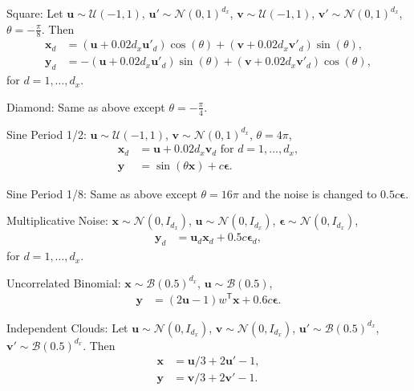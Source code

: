 \documentclass[11pt]{article}
\newcommand{\T}{^{\ensuremath{\mathsf{T}}}}           %
\providecommand{\mb}[1]{\boldsymbol{#1}}
\providecommand{\mc}[1]{\mathcal{#1}}
\begin{document}
\begin{compactenum}
\item Square: Let $\mb{u} \sim \mc{U}(-1,1)$, $\mb{u}' \sim \mc{N}(0,1)^{d_{x}}$, $\mb{v} \sim \mc{U}(-1,1)$, $\mb{v}' \sim \mc{N}(0,1)^{d_{x}}$, $\theta=-\frac{\pi}{8}$. Then
\begin{align*}
\mb{x}_{d}&=(\mb{u}+0.02 d_{x}\mb{u}'_{d}) \cos(\theta) + (\mb{v}+0.02 d_{x}\mb{v}'_{d}) \sin(\theta),\\
\mb{y}_{d}&=-(\mb{u}+0.02 d_{x}\mb{u}'_{d}) \sin(\theta) + (\mb{v}+0.02 d_{x}\mb{v}'_{d}) \cos(\theta),
\end{align*}
for $d=1,\ldots,d_{x}$.
\item Diamond: Same as above except $\theta=-\frac{\pi}{4}$.
\item Sine Period 1/2: $\mb{u} \sim \mc{U}(-1,1)$, $\mb{v} \sim \mc{N}(0,1)^{d_{x}}$, $\theta=4\pi$,
\begin{align*}
\mb{x}_{d}&=\mb{u}+0.02 d_{x} \mb{v}_{d} \mbox{ for $d=1,\ldots,d_{x}$}, \\
\mb{y}&=\sin ( \theta \mb{x} )+c\mb{\epsilon}.
\end{align*}
\item Sine Period 1/8: Same as above except $\theta=16\pi$ and the noise is changed to $0.5c\mb{\epsilon}$.
\item Multiplicative Noise: $\mb{x} \sim \mc{N}(0, I_{d_{x}})$, $\mb{u} \sim \mc{N}(0, I_{d_{x}})$, $\mb{\epsilon} \sim \mc{N}(0, I_{d_{x}})$,
\begin{align*}
\mb{y}_{d}&=\mb{u}_{d}\mb{x}_{d}+0.5c\mb{\epsilon}_{d},
\end{align*}
for $d=1,\ldots,d_{x}$.
\item Uncorrelated Binomial: $\mb{x} \sim \mc{B}(0.5)^{d_{x}}$, $\mb{u} \sim \mc{B}(0.5)$,
\begin{align*}
\mb{y}&=(2\mb{u}-1)w\T \mb{x}+0.6c\mb{\epsilon}.
\end{align*}
\item Independent Clouds: Let $\mb{u} \sim \mc{N}(0,I_{d_{x}})$, $\mb{v} \sim \mc{N}(0,I_{d_{x}})$, $\mb{u}' \sim \mc{B}(0.5)^{d_{x}}$, $\mb{v}' \sim \mc{B}(0.5)^{d_{x}}$. Then
\begin{align*}
\mb{x}&=\mb{u}/3+2\mb{u}'-1,\\
\mb{y}&=\mb{v}/3+2\mb{v}'-1.
\end{align*}
\end{compactenum}
\end{document}
